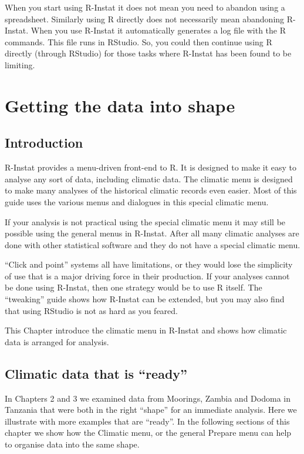 \documentclass[
  letterpaper,
  DIV=11,
  numbers=noendperiod]{scrreprt}
\begin{document}
When you start using R-Instat it does not mean you need to abandon using
a spreadsheet. Similarly using R directly does not necessarily mean
abandoning R-Instat. When you use R-Instat it automatically generates a
log file with the R commands. This file runs in RStudio. So, you could
then continue using R directly (through RStudio) for those tasks where
R-Instat has been found to be limiting.


\chapter{Getting the data into shape}\label{getting-the-data-into-shape}

\section{Introduction}\label{introduction-2}

R-Instat provides a menu-driven front-end to R. It is designed to make
it easy to analyse any sort of data, including climatic data. The
climatic menu is designed to make many analyses of the historical
climatic records even easier. Most of this guide uses the various menus
and dialogues in this special climatic menu.

If your analysis is not practical using the special climatic menu it may
still be possible using the general menus in R-Instat. After all many
climatic analyses are done with other statistical software and they do
not have a special climatic menu.

``Click and point'' systems all have limitations, or they would lose the
simplicity of use that is a major driving force in their production. If
your analyses cannot be done using R-Instat, then one strategy would be
to use R itself. The ``tweaking'' guide shows how R-Instat can be
extended, but you may also find that using RStudio is not as hard as you
feared.

This Chapter introduce the climatic menu in R-Instat and shows how
climatic data is arranged for analysis.

\section{Climatic data that is
``ready''}\label{climatic-data-that-is-ready}

In Chapters 2 and 3 we examined data from Moorings, Zambia and Dodoma in
Tanzania that were both in the right ``shape'' for an immediate
analysis. Here we illustrate with more examples that are ``ready''. In
the following sections of this chapter we show how the Climatic menu, or
the general Prepare menu can help to organise data into the same shape.
\end{document}

